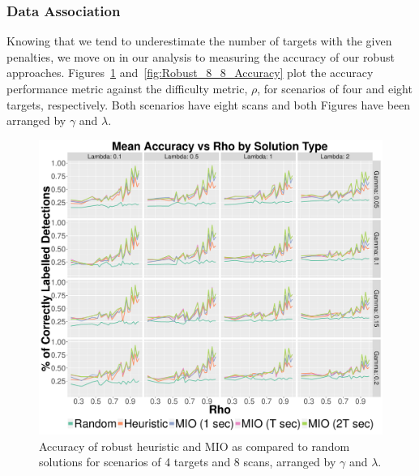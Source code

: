 \subsubsection{Data Association}
Knowing that we tend to underestimate the number of targets with the given penalties, we move on in our analysis to measuring the accuracy of our robust approaches. Figures~\ref{fig:Robust_4_8_Accuracy} and~\ref{fig:Robust_8_8_Accuracy} plot the accuracy performance metric against the difficulty metric, $\rho$, for scenarios of four and eight targets, respectively. Both scenarios have eight scans and both Figures have been arranged by $\gamma$ and $\lambda$.
\begin{figure}[ht]
  \centering
  \includegraphics[width=\columnwidth]{../Figures/4_8_Accuracy}
  \caption{Accuracy of robust heuristic and MIO as compared to random solutions for scenarios of 4 targets and 8 scans, arranged by $\gamma$ and $\lambda$.}
  \label{fig:Robust_4_8_Accuracy}
\end{figure}

